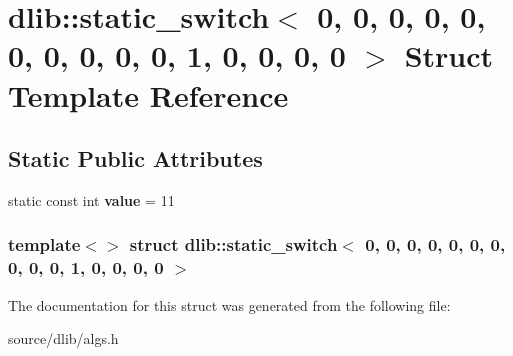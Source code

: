 \hypertarget{structdlib_1_1static__switch_3_010_00_010_00_010_00_010_00_010_00_010_00_010_00_010_00_010_00_0145cbcc58af0c0409c47cc48fc11394ec}{
\section{dlib::static\_\-switch$<$ 0, 0, 0, 0, 0, 0, 0, 0, 0, 0, 1, 0, 0, 0, 0 $>$ Struct Template Reference}
\label{structdlib_1_1static__switch_3_010_00_010_00_010_00_010_00_010_00_010_00_010_00_010_00_010_00_0145cbcc58af0c0409c47cc48fc11394ec}
}
\subsection*{Static Public Attributes}
\begin{DoxyCompactItemize}
\item 
\hypertarget{structdlib_1_1static__switch_3_010_00_010_00_010_00_010_00_010_00_010_00_010_00_010_00_010_00_0145cbcc58af0c0409c47cc48fc11394ec_a2553c31a2b94169adbbb842919989879}{
static const int {\bfseries value} = 11}
\label{structdlib_1_1static__switch_3_010_00_010_00_010_00_010_00_010_00_010_00_010_00_010_00_010_00_0145cbcc58af0c0409c47cc48fc11394ec_a2553c31a2b94169adbbb842919989879}

\end{DoxyCompactItemize}
\subsubsection*{template$<$$>$ struct dlib::static\_\-switch$<$ 0, 0, 0, 0, 0, 0, 0, 0, 0, 0, 1, 0, 0, 0, 0 $>$}



The documentation for this struct was generated from the following file:\begin{DoxyCompactItemize}
\item 
source/dlib/algs.h\end{DoxyCompactItemize}
